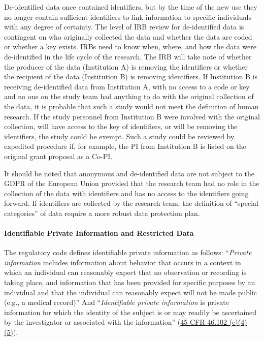 De-identified data once contained identifiers, but by the time of the new use they no longer contain sufficient identifiers to link information to specific individuals with any degree of certainty. The level of IRB review for de-identified data is contingent on who originally collected the data and whether the data are coded or whether a key exists. IRBs need to know when, where, and how the data were de-identified in the life cycle of the research. The IRB will take note of whether the producer of the data (Institution A) is removing the identifiers or whether the recipient of the data (Institution B) is removing identifiers. If Institution B is receiving de-identified data from Institution A, with no access to a code or key and no one on the study team had anything to do with the original collection of the data, it is probable that such a study would not meet the definition of human research. If the study personnel from Institution B were involved with the original collection, will have access to the key of identifiers, or will be removing the identifiers, the study could be exempt. Such a study could be reviewed by expedited procedure if, for example, the PI from Institution B is listed on the original grant proposal as a Co-PI.


\begin{bbox}

It should be noted that anonymous and de-identified data are not subject to the GDPR of the European Union provided that the research team had no role in the collection of the data with identifiers and has no access to the identifiers going forward. If identifiers are collected by the research team, the definition of ``special categories'' of data require a more robust data protection plan.

\end{bbox}


\hypertarget{identifiable-private-information-and-restricted-data}{%
\paragraph{Identifiable Private Information and Restricted Data}\label{identifiable-private-information-and-restricted-data}}

The regulatory code defines identifiable private information as follows: ``\emph{Private information} includes information about behavior that occurs in a context in which an individual can reasonably expect that no observation or recording is taking place, and information that has been provided for specific purposes by an individual and that the individual can reasonably expect will not be made public (e.g., a medical record)'' And ``\emph{Identifiable private information} is private information for which the identity of the subject is or may readily be ascertained by the investigator or associated with the information'' (\href{https://www.law.cornell.edu/cfr/text/45/46.102}{45 CFR 46.102 (e)(4)(5)}).

